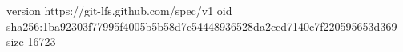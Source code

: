 version https://git-lfs.github.com/spec/v1
oid sha256:1ba92303f77995f4005b5b58d7c54448936528da2ccd7140c7f220595653d369
size 16723
